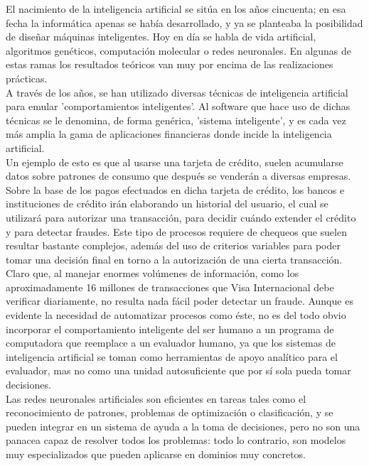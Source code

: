 El nacimiento de la inteligencia artificial se sitúa en los años cincuenta; en esa fecha la informática apenas se había desarrollado, y ya se planteaba la posibilidad de diseñar máquinas inteligentes. Hoy en día se habla de vida artificial, algoritmos genéticos, computación molecular o redes neuronales. En algunas de estas ramas los resultados teóricos van muy por encima de las realizaciones prácticas.\\

A través de los años, se han utilizado diversas técnicas de inteligencia artificial para emular 'comportamientos inteligentes'. Al software que hace uso de dichas técnicas se le denomina, de forma genérica, 'sistema inteligente', y es cada vez más amplia la gama de aplicaciones financieras donde incide la inteligencia artificial.\\

Un ejemplo de esto es que al usarse una tarjeta de crédito, suelen acumularse datos sobre patrones de consumo que después se venderán a diversas empresas. Sobre la base de los pagos efectuados en dicha tarjeta de crédito, los bancos e instituciones de crédito irán elaborando un historial del usuario, el cual se utilizará para autorizar una transacción, para decidir cuándo extender el crédito y para detectar fraudes. Este tipo de procesos requiere de chequeos que suelen resultar bastante complejos, además del uso de criterios variables para poder tomar una decisión final en torno a la autorización de una cierta transacción. Claro que, al manejar enormes volúmenes de información, como los aproximadamente 16 millones de transacciones que Visa Internacional debe verificar diariamente, no resulta nada fácil poder detectar un fraude. Aunque es evidente la necesidad de automatizar procesos como éste, no es del todo obvio incorporar el comportamiento inteligente del ser humano a un programa de computadora que reemplace a un evaluador humano, ya que los sistemas de inteligencia artificial se toman como herramientas de apoyo analítico para el evaluador, mas no como una unidad autosuficiente que por sí sola pueda tomar decisiones.\\

Las redes neuronales artificiales son eficientes en tareas tales como el reconocimiento de patrones, problemas de optimización o clasificación, y se pueden integrar en un sistema de ayuda a la toma de decisiones, pero no son una panacea capaz de resolver todos los problemas: todo lo contrario, son modelos muy especializados que pueden aplicarse en dominios muy concretos.\\

